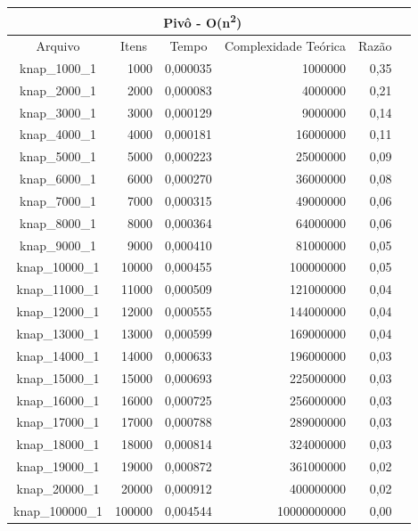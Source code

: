 \documentclass[
	12pt,				%
	oneside,			%
	a4paper,			%
	english,			%
	french,				%
	spanish,			%
	brazil,				%
	]{abntex2}
\begin{document}
\begin{longtable}{|c|r|r|r|r|r|}
\toprule
\multicolumn{5}{|c|}{\cellcolor{gray!25}\textbf{Pivô - O(n\textsuperscript{2})}}\\
\midrule
\multicolumn{1}{|c|}{\cellcolor{gray!10}Arquivo} & \multicolumn{1}{|c|}{\cellcolor{gray!10}Itens} &  \multicolumn{1}{|c|}{\cellcolor{gray!10}Tempo} &
\multicolumn{1}{|c|}{\cellcolor{gray!10}Complexidade Teórica} &
\multicolumn{1}{|c|}{\cellcolor{gray!10}Razão}\\ \hline
\hline
knap\_1000\_1	&	1000	&	0,000035	&	1000000	&	0,35	 \\ \hline
knap\_2000\_1	&	2000	&	0,000083	&	4000000	&	0,21	 \\ \hline
knap\_3000\_1	&	3000	&	0,000129	&	9000000	&	0,14	 \\ \hline
knap\_4000\_1	&	4000	&	0,000181	&	16000000	&	0,11	 \\ \hline
knap\_5000\_1	&	5000	&	0,000223	&	25000000	&	0,09	 \\ \hline
knap\_6000\_1	&	6000	&	0,000270	&	36000000	&	0,08	 \\ \hline
knap\_7000\_1	&	7000	&	0,000315	&	49000000	&	0,06	 \\ \hline
knap\_8000\_1	&	8000	&	0,000364	&	64000000	&	0,06	 \\ \hline
knap\_9000\_1	&	9000	&	0,000410	&	81000000	&	0,05	 \\ \hline
knap\_10000\_1	&	10000	&	0,000455	&	100000000	&	0,05	 \\ \hline
knap\_11000\_1	&	11000	&	0,000509	&	121000000	&	0,04	 \\ \hline
knap\_12000\_1	&	12000	&	0,000555	&	144000000	&	0,04	 \\ \hline
knap\_13000\_1	&	13000	&	0,000599	&	169000000	&	0,04	 \\ \hline
knap\_14000\_1	&	14000	&	0,000633	&	196000000	&	0,03	 \\ \hline
knap\_15000\_1	&	15000	&	0,000693	&	225000000	&	0,03	 \\ \hline
knap\_16000\_1	&	16000	&	0,000725	&	256000000	&	0,03	 \\ \hline
knap\_17000\_1	&	17000	&	0,000788	&	289000000	&	0,03	 \\ \hline
knap\_18000\_1	&	18000	&	0,000814	&	324000000	&	0,03	 \\ \hline
knap\_19000\_1	&	19000	&	0,000872	&	361000000	&	0,02	 \\ \hline
knap\_20000\_1	&	20000	&	0,000912	&	400000000	&	0,02	 \\ \hline
knap\_100000\_1	&	100000	&	0,004544	&	10000000000	&	0,00	 \\ \hline
\end{longtable}
\end{document}
